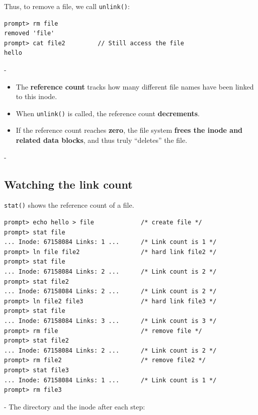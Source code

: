 \documentclass[11pt,a4paper]{article}
\makeatletter
\newcommand{\keepspace}[1]{\par\penalty-100\begingroup
  \setlength{\dimen@}{#1}\dimen@ii\pagegoal\advance\dimen@ii-\pagetotal
  \ifdim\dimen@>\dimen@ii\ifdim\dimen@ii>\z@\vfil\fi\break\fi\endgroup}
\makeatother
\begin{document}
Thus, to remove a file, we call \texttt{unlink()}:

\begin{lstlisting}[style=term]
prompt> rm file
removed 'file'
prompt> cat file2         // Still access the file
hello
\end{lstlisting}

\keepspace{7\baselineskip}
\begin{defbox}
\begin{itemize}
  \item The \textbf{reference count} tracks how many different file names
        have been linked to this inode.
  \item When \texttt{unlink()} is called, the reference count
        \textbf{decrements}.
  \item If the reference count reaches \textbf{zero}, the file system
        \textbf{frees the inode and related data blocks}, and thus truly
        ``deletes'' the file.
\end{itemize}
\end{defbox}

\keepspace{22\baselineskip}
\subsection{Watching the link count}

\texttt{stat()} shows the reference count of a file.

\begin{lstlisting}[style=term]
prompt> echo hello > file             /* create file */
prompt> stat file
... Inode: 67158084 Links: 1 ...      /* Link count is 1 */
prompt> ln file file2                 /* hard link file2 */
prompt> stat file
... Inode: 67158084 Links: 2 ...      /* Link count is 2 */
prompt> stat file2
... Inode: 67158084 Links: 2 ...      /* Link count is 2 */
prompt> ln file2 file3                /* hard link file3 */
prompt> stat file
... Inode: 67158084 Links: 3 ...      /* Link count is 3 */
prompt> rm file                       /* remove file */
prompt> stat file2
... Inode: 67158084 Links: 2 ...      /* Link count is 2 */
prompt> rm file2                      /* remove file2 */
prompt> stat file3
... Inode: 67158084 Links: 1 ...      /* Link count is 1 */
prompt> rm file3
\end{lstlisting}

\keepspace{12\baselineskip}
The directory and the inode after each step:
\end{document}
